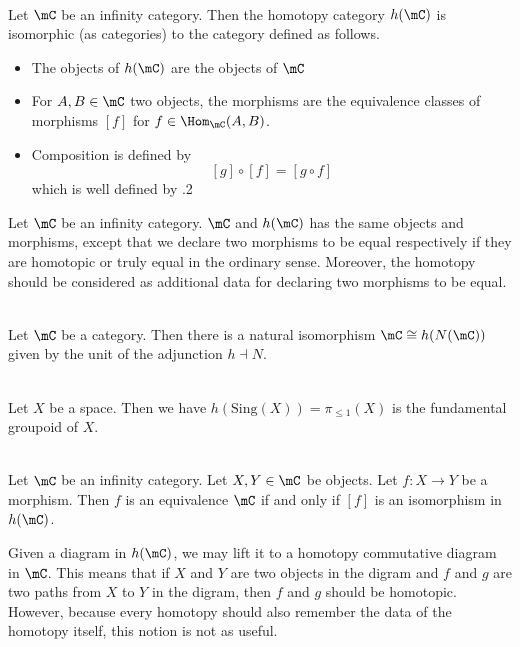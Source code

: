 \documentclass[a4paper]{article}
\begin{document}
\begin{prp}{}{}\\ Let $\mC$ be an infinity category. Then the homotopy category $h(\mC)$ is isomorphic (as categories) to the category defined as follows. 
\begin{itemize}
\item The objects of $h(\mC)$ are the objects of $\mC$
\item For $A,B\in\mC$ two objects, the morphisms are the equivalence classes of morphisms $[f]$ for $f\in\Hom_\mC(A,B)$. 
\item Composition is defined by $$[g]\circ[f]=[g\circ f]$$ which is well defined by .2
\end{itemize}
\end{prp}

Let $\mC$ be an infinity category. $\mC$ and $h(\mC)$ has the same objects and morphisms, except that we declare two morphisms to be equal respectively if they are homotopic or truly equal in the ordinary sense. Moreover, the homotopy should be considered as additional data for declaring two morphisms to be equal. 

\begin{eg}{}{}\\
Let $\mC$ be a category. Then there is a natural isomorphism $\mC\cong h(N(\mC))$ given by the unit of the adjunction $h\dashv N$. 
\end{eg}

\begin{eg}{}{}\\
Let $X$ be a space. Then we have $h(\text{Sing}(X))=\pi_{\leq 1}(X)$ is the fundamental groupoid of $X$. 
\end{eg}

\begin{lmm}{}{}\\
Let $\mC$ be an infinity category. Let $X,Y\in\mC$ be objects. Let $f:X\to Y$ be a morphism. Then $f$ is an equivalence $\mC$ if and only if $[f]$ is an isomorphism in $h(\mC)$. 
\end{lmm}

Given a diagram in $h(\mC)$, we may lift it to a homotopy commutative diagram in $\mC$. This means that if $X$ and $Y$ are two objects in the digram and $f$ and $g$ are two paths from $X$ to $Y$ in the digram, then $f$ and $g$ should be homotopic. However, because every homotopy should also remember the data of the homotopy itself, this notion is not as useful. \\
\end{document}
